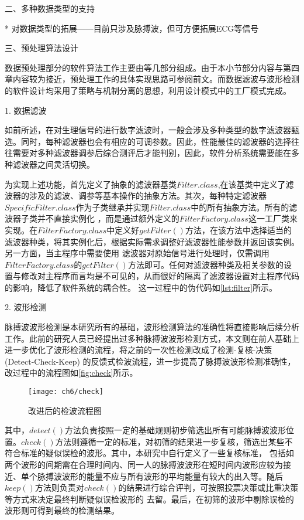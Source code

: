 二、多种数据类型的支持

* 对数据类型的拓展——目前只涉及脉搏波，但可方便拓展ECG等信号

三、预处理算法设计

数据预处理部分的软件算法工作主要由等几部分组成。由于本小节部分内容与第四章内容较为接近，预处理工作的具体实现思路可参阅前文。而数据滤波与波形检测的软件设计均采用了策略与机制分离的思想，利用设计模式中的工厂模式\cite{Enrich2018}完成。

1. 数据滤波

如前所述，在对生理信号的进行数字滤波时，一般会涉及多种类型的数字滤波器甄选。同时，每种滤波器也会有相应的可调参数。因此，性能最佳的滤波器的选择往往需要对多种滤波器调参后综合测评后才能判别，因此，软件分析系统需要能在多种滤波器之间灵活切换。

为实现上述功能，首先定义了抽象的滤波器基类$Filter.class$,在该基类中定义了滤波器的涉及的滤波、调参等基本操作的抽象方法。其次，每种特定滤波器$SpecificFilter.class$作为子类继承并实现$Filter.class$中的所有抽象方法。所有的滤波器子类并不直接实例化
，而是通过额外定义的$FilterFactory.class$这一工厂类来实现。在$FilterFactory.class$中定义好$getFilter()$方法，在该方法中选择适当的滤波器种类，将其实例化后，根据实际需求调整好滤波器性能参数并返回该实例。另一方面，当主程序中需要使用
滤波器对原始信号进行处理时，仅需调用$FilterFactory.class$的$getFilter()$方法即可。任何对滤波器种类及相关参数的设置与修改对主程序而言均是不可见的，从而很好的隔离了滤波器设置对主程序代码的影响，降低了软件系统的耦合性。
这一过程中的伪代码如\autoref{lst:filter}所示。


2. 波形检测

脉搏波波形检测是本研究所有的基础，波形检测算法的准确性将直接影响后续分析工作。此前的研究人员已经提出过多种脉搏波波形检测方式\cite{Wang2012}，本文则在前人基础上进一步优化了波形检测的流程，将之前的一次性检测改成了检测-复核-决策(Detect-Check-Keep)
的反馈式检波流程，进一步提高了脉搏波波形检测准确性，改过程中的流程图如\autoref{fig:check}所示。
\begin{figure}[htbp]
    \centering
    \texttt{[image: ch6/check]}
    \caption{\label{fig:check}改进后的检波流程图}
\end{figure}

其中，$detect()$方法负责按照一定的基础规则初步筛选出所有可能脉搏波波形位置。$check()$方法则遵循一定的标准，对初筛的结果进一步复核，筛选出某些不符合标准的疑似误检的波形。其中，本研究中自行定义了一些复核标准，
包括如两个波形的间期需在合理时间内、同一人的脉搏波波形在短时间内波形应较为接近、单个脉搏波波形的能量不应与所有波形的平均能量有较大的出入等。随后$keep()$方法则负责对$check()$的结果进行综合评判，可按照投票决策或比重决策等方式来决定最终判断疑似误检波形的
去留。最后，在初筛的波形中剔除误检的波形则可得到最终的检测结果。


